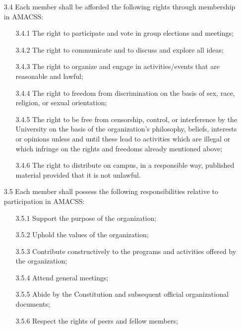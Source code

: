 \documentclass[12pt,a4paper]{article}
\begin{document}
\begin{enumerate}
\item[3.4] Each member shall be afforded the following rights through membership in AMACSS:

\begin{enumerate}
\item[3.4.1] The right to participate and vote in group elections and meetings;

\item[3.4.2] The right to communicate and to discuss and explore all ideas;

\item[3.4.3] The right to organize and engage in activities/events that are reasonable and lawful;

\item[3.4.4] The right to freedom from discrimination on the basis of sex, race, religion, or sexual orientation;

\item[3.4.5] The right to be free from censorship, control, or interference by the University on the basis of the organization's philosophy, beliefs, interests or opinions unless and until these lead to activities which are illegal or which infringe on the rights and freedoms already mentioned above;

\item[3.4.6] The right to distribute on campus, in a responsible way, published material provided that it is not unlawful.
\end{enumerate}

\item[3.5] Each member shall possess the following responsibilities relative to participation in AMACSS:

\begin{enumerate}
\item[3.5.1] Support the purpose of the organization;

\item[3.5.2] Uphold the values of the organization;

\item[3.5.3] Contribute constructively to the programs and activities offered by the organization;

\item[3.5.4] Attend general meetings;

\item[3.5.5] Abide by the Constitution and subsequent official organizational documents;

\item[3.5.6] Respect the rights of peers and fellow members;


\end{enumerate}
\end{enumerate}
\end{document}
